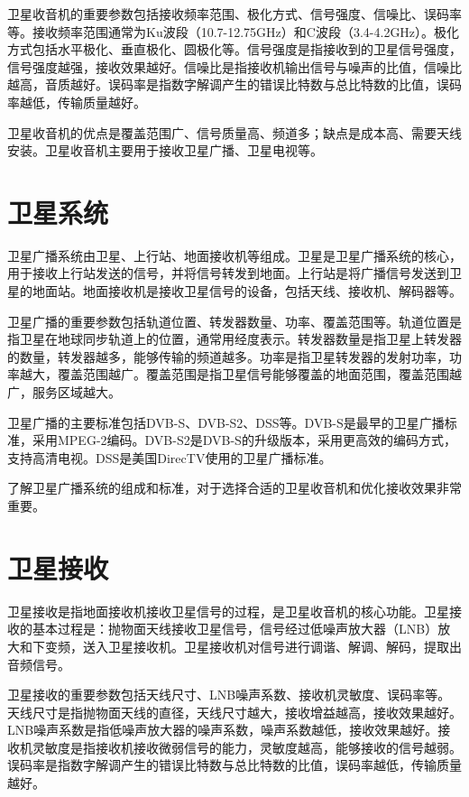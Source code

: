 \documentclass[12pt,UTF8]{ctexbook}
\begin{document}
卫星收音机的重要参数包括接收频率范围、极化方式、信号强度、信噪比、误码率等。接收频率范围通常为Ku波段（10.7-12.75GHz）和C波段（3.4-4.2GHz）。极化方式包括水平极化、垂直极化、圆极化等。信号强度是指接收到的卫星信号强度，信号强度越强，接收效果越好。信噪比是指接收机输出信号与噪声的比值，信噪比越高，音质越好。误码率是指数字解调产生的错误比特数与总比特数的比值，误码率越低，传输质量越好。

卫星收音机的优点是覆盖范围广、信号质量高、频道多；缺点是成本高、需要天线安装。卫星收音机主要用于接收卫星广播、卫星电视等。

\section{卫星系统}

卫星广播系统由卫星、上行站、地面接收机等组成。卫星是卫星广播系统的核心，用于接收上行站发送的信号，并将信号转发到地面。上行站是将广播信号发送到卫星的地面站。地面接收机是接收卫星信号的设备，包括天线、接收机、解码器等。

卫星广播的重要参数包括轨道位置、转发器数量、功率、覆盖范围等。轨道位置是指卫星在地球同步轨道上的位置，通常用经度表示。转发器数量是指卫星上转发器的数量，转发器越多，能够传输的频道越多。功率是指卫星转发器的发射功率，功率越大，覆盖范围越广。覆盖范围是指卫星信号能够覆盖的地面范围，覆盖范围越广，服务区域越大。

卫星广播的主要标准包括DVB-S、DVB-S2、DSS等。DVB-S是最早的卫星广播标准，采用MPEG-2编码。DVB-S2是DVB-S的升级版本，采用更高效的编码方式，支持高清电视。DSS是美国DirecTV使用的卫星广播标准。

了解卫星广播系统的组成和标准，对于选择合适的卫星收音机和优化接收效果非常重要。

\section{卫星接收}

卫星接收是指地面接收机接收卫星信号的过程，是卫星收音机的核心功能。卫星接收的基本过程是：抛物面天线接收卫星信号，信号经过低噪声放大器（LNB）放大和下变频，送入卫星接收机。卫星接收机对信号进行调谐、解调、解码，提取出音频信号。

卫星接收的重要参数包括天线尺寸、LNB噪声系数、接收机灵敏度、误码率等。天线尺寸是指抛物面天线的直径，天线尺寸越大，接收增益越高，接收效果越好。LNB噪声系数是指低噪声放大器的噪声系数，噪声系数越低，接收效果越好。接收机灵敏度是指接收机接收微弱信号的能力，灵敏度越高，能够接收的信号越弱。误码率是指数字解调产生的错误比特数与总比特数的比值，误码率越低，传输质量越好。
\end{document}
